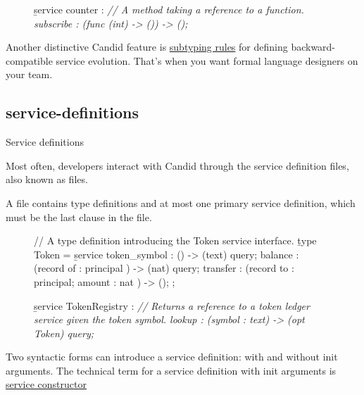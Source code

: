 \documentclass{article}
\begin{document}
\begin{figure}
\begin{code}[candid]
\b{service} counter : {
  \em{// A method taking a reference to a function.}
  subscribe : (func (int) -> ()) -> ();
}
\end{code}
\end{figure}

Another distinctive Candid feature is \href{#subtyping}{subtyping rules} for defining backward-compatible service evolution.
That's when you want formal language designers on your team.

\subsection{service-definitions}{Service definitions}

Most often, developers interact with Candid through the service definition files, also known as \href{https://internetcomputer.org/docs/current/developer-docs/backend/candid/candid-howto#the-did-file}{} files.

A  file contains type definitions and at most one primary service definition, which must be the last clause in the  file.

\begin{figure}
\begin{code}[candid]
// A type definition introducing the Token service interface.
\b{type} Token = \b{service} {
  token_symbol : () -> (text) query;
  balance : (record { of : principal }) -> (nat) query;
  transfer : (record { to : principal; amount : nat }) -> ();
};

\b{service} TokenRegistry : {
  \em{// Returns a reference to a token ledger service given the token symbol.}
  lookup : (symbol : text) -> (opt Token) query;
}
\end{code}
\end{figure}

Two syntactic forms can introduce a service definition: with and without init arguments.
The technical term for a service definition with init arguments is \href{https://github.com/dfinity/candid/blob/master/spec/Candid.md#services}{service constructor}
\end{document}

